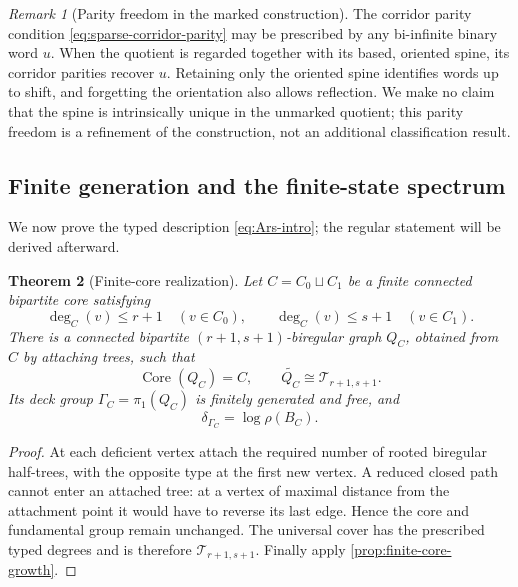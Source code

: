 \documentclass[11pt]{amsart}
\theoremstyle{plain}
\newtheorem{theorem}{Theorem}[section]
\theoremstyle{definition}
\theoremstyle{remark}
\newtheorem{remark}[theorem]{Remark}
\newcommand{\T}{\mathcal T}
\newcommand{\Core}{\operatorname{Core}}
\begin{document}
\begin{remark}[Parity freedom in the marked construction]
The corridor parity condition \eqref{eq:sparse-corridor-parity} may be
prescribed by any bi-infinite binary word \(u\).  When the quotient is
regarded together with its based, oriented spine, its corridor parities
recover \(u\).  Retaining only the oriented spine identifies words up to
shift, and forgetting the orientation also allows reflection.  We make no
claim that the spine is intrinsically unique in the unmarked quotient; this
parity freedom is a refinement of the construction, not an additional
classification result.
\end{remark}



\subsection{Finite generation and the finite-state spectrum}
\label{sec:fg-spectrum}

We now prove the typed description \eqref{eq:Ars-intro}; the regular
statement will be derived afterward.

\begin{theorem}[Finite-core realization]\label{thm:finite-core-realization}
Let \(C=C_0\sqcup C_1\) be a finite connected bipartite core satisfying
\[
  \deg_C(v)\leq r+1\quad(v\in C_0),
  \qquad
  \deg_C(v)\leq s+1\quad(v\in C_1).
\]
There is a connected bipartite \((r+1,s+1)\)-biregular graph \(Q_C\),
obtained from \(C\) by attaching trees, such that
\[
  \Core(Q_C)=C,
  \qquad
  \widetilde{Q_C}\cong\T_{r+1,s+1}.
\]
Its deck group \(\Gamma_C=\pi_1(Q_C)\) is finitely generated and free, and
\[
  \delta_{\Gamma_C}=\log\rho(B_C).
\]
\end{theorem}

\begin{proof}
At each deficient vertex attach the required number of rooted biregular
half-trees, with the opposite type at the first new vertex.  A reduced closed
path cannot enter an attached tree: at a vertex of maximal distance from the
attachment point it would have to reverse its last edge.  Hence the core and
fundamental group remain unchanged.  The universal cover has the prescribed
typed degrees and is therefore \(\T_{r+1,s+1}\).  Finally apply
\cref{prop:finite-core-growth}.
\end{proof}
\end{document}
